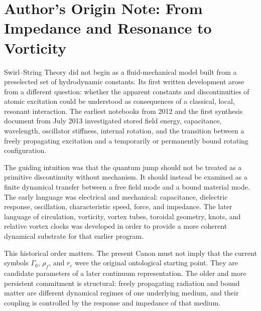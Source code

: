 \documentclass[11pt]{article}
\theoremstyle{definition}
\theoremstyle{plain}
\theoremstyle{remark}
\renewcommand{\cftsecfont}{\footnotesize}
\renewcommand{\cftsubsecfont}{\footnotesize\itshape}
\newcommand{\compacttoc}{%
    \begingroup
    \setlength{\cftparskip}{0pt}%
    \setlength{\cftbeforesecskip}{0.5pt}%
    \setlength{\cftbeforesubsecskip}{0.5pt}%
    \renewcommand{\cftsecfont}{\scriptsize}%
    \renewcommand{\cftsubsecfont}{\scriptsize\itshape}%
    \renewcommand{\cftsecpagefont}{\scriptsize}%
    \renewcommand{\cftsubsecpagefont}{\scriptsize}%
    \setlength{\cftsecnumwidth}{2.8em}%
    \setlength{\cftsubsecindent}{1.4em}%
    \renewcommand{\cftdotsep}{2}%
    \setlength{\parskip}{0pt}%
    \linespread{0.80}\selectfont
    \tableofcontents
    \endgroup
}
\newcommand{\rhoF}{{\rho_{\!f}}}
\newcommand{\rc}{{r_c}}
\begin{document}
    \newpage
    \compacttoc
    \newpage




\section*{Author's Origin Note: From Impedance and Resonance to Vorticity}
\label{sec:authors_origin_note}

Swirl--String Theory did not begin as a fluid-mechanical model built from a
preselected set of hydrodynamic constants. Its first written development arose
from a different question: whether the apparent constants and discontinuities
of atomic excitation could be understood as consequences of a classical,
local, resonant interaction. The earliest notebooks from 2012 and the first
synthesis document from July 2013 investigated stored field energy,
capacitance, wavelength, oscillator stiffness, internal rotation, and the
transition between a freely propagating excitation and a temporarily or
permanently bound rotating configuration.

The guiding intuition was that the quantum jump should not be treated as a
primitive discontinuity without mechanism. It should instead be examined as a
finite dynamical transfer between a free field mode and a bound material mode.
The early language was electrical and mechanical: capacitance, dielectric
response, oscillation, characteristic speed, force, and impedance. The later
language of circulation, vorticity, vortex tubes, toroidal geometry, knots, and
relative vortex clocks was developed in order to provide a more coherent
dynamical substrate for that earlier program.

This historical order matters. The present Canon must not imply that the
current symbols $\Gamma_0$, $\rhoF$, and $\rc$ were the original ontological
starting point. They are candidate parameters of a later continuum
representation. The older and more persistent commitment is structural:
freely propagating radiation and bound matter are different dynamical regimes
of one underlying medium, and their coupling is controlled by the response and
impedance of that medium.
\end{document}
